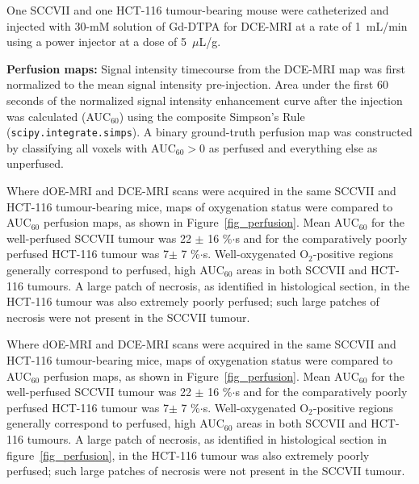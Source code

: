 One SCCVII and one HCT-116 tumour-bearing mouse were catheterized and injected with 30-mM solution of Gd-DTPA for \acs{DCE-MRI} at a rate of 1~mL/min using a power injector at a dose of 5~$\mu$L/g.

\noindent\textbf{Perfusion maps:} Signal intensity timecourse from the DCE-MRI map was first normalized to the mean signal intensity pre-injection.
Area under the first 60 seconds of the normalized signal intensity enhancement curve after the injection was calculated (\acs{AUC}$_{60}$) using the composite Simpson's Rule (\texttt{scipy.integrate.simps}).
A binary ground-truth perfusion map was constructed by classifying all voxels with AUC$_{60} > 0$ as perfused and everything else as unperfused.

Where \ac{dOE-MRI} and DCE-MRI scans were acquired in the same SCCVII and HCT-116 tumour-bearing mice,  maps of oxygenation status were compared to \acs{AUC}$_{60}$ perfusion maps, as shown in Figure~\ref{fig_perfusion}.
Mean \acs{AUC}$_{60}$ for the well-perfused SCCVII tumour was 22 $\pm$ 16 \%$\cdot$s and for the comparatively poorly perfused HCT-116 tumour was 7$\pm$ 7 \%$\cdot$s.
Well-oxygenated O$_2$-positive regions generally correspond to perfused, high \acs{AUC}$_{60}$ areas in both SCCVII and HCT-116 tumours.
A large patch of necrosis, as identified in histological section, in the HCT-116 tumour was also extremely poorly perfused; such large patches of necrosis were not present in the SCCVII tumour.

Where \acs{dOE-MRI} and \acs{DCE-MRI} scans were acquired in the same SCCVII and HCT-116 tumour-bearing mice,  maps of oxygenation status were compared to \acs{AUC}$_{60}$ perfusion maps, as shown in Figure~\ref{fig_perfusion}.
Mean \acs{AUC}$_{60}$ for the well-perfused SCCVII tumour was 22 $\pm$ 16 \%$\cdot$s and for the comparatively poorly perfused HCT-116 tumour was 7$\pm$ 7 \%$\cdot$s.
Well-oxygenated O$_2$-positive regions generally correspond to perfused, high \acs{AUC}$_{60}$ areas in both SCCVII and HCT-116 tumours.
A large patch of necrosis, as identified in histological section in figure~\ref{fig_perfusion}, in the HCT-116 tumour was also extremely poorly perfused; such large patches of necrosis were not present in the SCCVII tumour.

